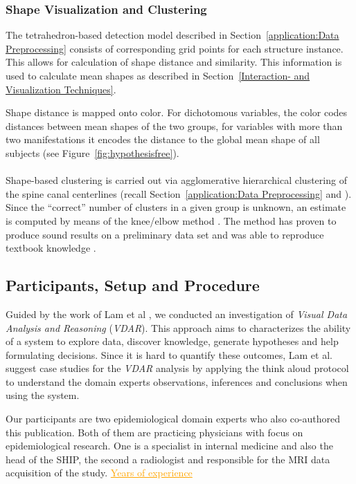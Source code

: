 \documentclass[journal]{style/vgtc} 			          %
\newcommand{\com}[1]{\textcolor{orange}{\uline{#1}}}
\begin{document}
\subsubsection{Shape Visualization and Clustering}
%
The tetrahedron-based detection model described in Section~\ref{application:Data Preprocessing} consists of corresponding grid points for each structure instance.
%
This allows for calculation of shape distance and similarity.
%
This information is used to calculate mean shapes as described in Section~\ref{Interaction- and Visualization Techniques}.

Shape distance is mapped onto color.
%
For dichotomous variables, the color codes distances between mean shapes of the two groups, for variables with more than two manifestations it encodes the distance to the global mean shape of all subjects (see Figure~\ref{fig:hypothesisfree}).
\\\\
Shape-based clustering is carried out via agglomerative hierarchical clustering of the spine canal centerlines (recall Section~\ref{application:Data Preprocessing} and \cite{Klemm2013VMV}).
%
Since the ``correct'' number of clusters in a given group is unknown, an estimate is computed by means of the knee/elbow method \cite{Salvador2004}.
%
The method has proven to produce sound results on a preliminary data set and was able to reproduce textbook knowledge \cite{Klemm2013VMV}.
\subsection{Participants, Setup and Procedure}
%
%
Guided by the work of Lam et al \cite{Lam2012}, we conducted an investigation of \emph{Visual Data Analysis and Reasoning} (\emph{VDAR}).
%
This approach aims to characterizes the ability of a system to explore data, discover knowledge, generate hypotheses and help formulating decisions.
%
Since it is hard to quantify these outcomes, Lam et al. suggest case studies for the \emph{VDAR} analysis by applying the think aloud protocol to understand the domain experts observations, inferences and conclusions when using the system.

Our participants are two epidemiological domain experts who also co-authored this publication.
%
Both of them are practicing physicians with focus on epidemiological research.
%
One is a specialist in internal medicine and also the head of the SHIP, the second a radiologist and responsible for the MRI data acquisition of the study. \com{Years of experience} %
%
%
\end{document}
